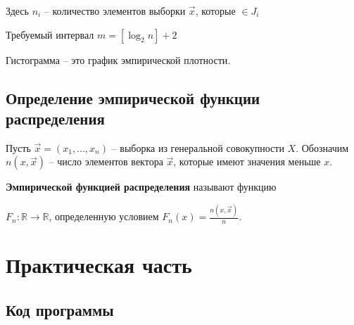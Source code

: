 \documentclass[12pt]{report}
\begin{document}
    Здесь $n_i$ -- количество элементов выборки $\vec x$, которые
    $\in J_i$
    
    \hfill
    
    Требуемый интервал $m=[\log_2n] +2$
    
    \hfill

Гистограмма -- это график эмпирической плотности. 

\section*{Определение эмпирической функции распределения}

\hfill 

Пусть $\vec x = (x_1, ..., x_n)$ -- выборка из генеральной совокупности $X$. Обозначим $n(x, \vec x)$ -- число элементов вектора $\vec x$, которые имеют значения меньше $x$.

\hfill

\textbf{Эмпирической функцией распределения} называют функцию 

$F_n : \mathbb{R} \to \mathbb{R}$, определенную условием $F_n(x) = \frac{n(x, \vec x)}{n}$. 





\chapter*{Практическая часть}

\section*{Код программы}
\end{document}
